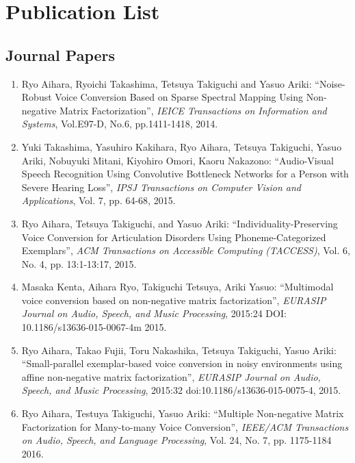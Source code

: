 


\chapter {Publication List}       %
\label{chap:PubList}

\section*{Journal Papers}
\begin{enumerate}

\item Ryo Aihara, Ryoichi Takashima, Tetsuya Takiguchi and Yasuo Ariki:
``Noise-Robust Voice Conversion Based on Sparse Spectral Mapping Using Non-negative Matrix Factorization'',
\textit{IEICE Transactions on Information and Systems}, Vol.E97-D, No.6, pp.1411-1418, 2014.

\item Yuki Takashima, Yasuhiro Kakihara, Ryo Aihara, Tetsuya Takiguchi, Yasuo Ariki, Nobuyuki Mitani, Kiyohiro Omori, Kaoru Nakazono:
``Audio-Visual Speech Recognition Using Convolutive Bottleneck Networks for a Person with Severe Hearing Loss'',
\textit{IPSJ Transactions on Computer Vision and Applications}, Vol. 7, pp. 64-68, 2015.

\item Ryo Aihara, Tetsuya Takiguchi, and Yasuo Ariki:
``Individuality-Preserving Voice Conversion for Articulation Disorders Using Phoneme-Categorized Exemplars'',
\textit{ACM Transactions on Accessible Computing (TACCESS)}, Vol. 6, No. 4, pp. 13:1-13:17, 2015.

\item Masaka Kenta, Aihara Ryo, Takiguchi Tetsuya, Ariki Yasuo:
``Multimodal voice conversion based on non-negative matrix factorization'',
\textit{EURASIP Journal on Audio, Speech, and Music Processing}, 2015:24 DOI: 10.1186/s13636-015-0067-4m 2015.

\item Ryo Aihara, Takao Fujii, Toru Nakashika, Tetsuya Takiguchi, Yasuo Ariki:
``Small-parallel exemplar-based voice conversion in noisy environments using affine non-negative matrix factorization'',
\textit{EURASIP Journal on Audio, Speech, and Music Processing}, 2015:32 doi:10.1186/s13636-015-0075-4, 2015.

\item Ryo Aihara, Testuya Takiguchi, Yasuo Ariki:
``Multiple Non-negative Matrix Factorization for Many-to-many Voice Conversion'',
\textit{IEEE/ACM Transactions on Audio, Speech, and Language Processing}, Vol. 24, No. 7, pp. 1175-1184 2016.

\end{enumerate}

